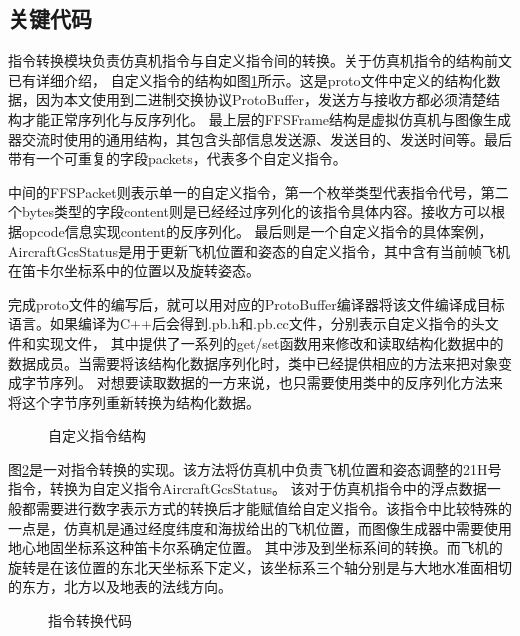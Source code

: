 \subsection{关键代码}
指令转换模块负责仿真机指令与自定义指令间的转换。关于仿真机指令的结构前文已有详细介绍，
自定义指令的结构如图\ref{protostruct}所示。这是proto文件中定义的结构化数据，因为本文使用到二进制交换协议ProtoBuffer，发送方与接收方都必须清楚结构才能正常序列化与反序列化。
最上层的FFSFrame结构是虚拟仿真机与图像生成器交流时使用的通用结构，其包含头部信息发送源、发送目的、发送时间等。最后带有一个可重复的字段packets，代表多个自定义指令。
\par
中间的FFSPacket则表示单一的自定义指令，第一个枚举类型代表指令代号，第二个bytes类型的字段content则是已经经过序列化的该指令具体内容。接收方可以根据opcode信息实现content的反序列化。
最后则是一个自定义指令的具体案例，AircraftGcsStatus是用于更新飞机位置和姿态的自定义指令，其中含有当前帧飞机在笛卡尔坐标系中的位置以及旋转姿态。
\par
完成proto文件的编写后，就可以用对应的ProtoBuffer编译器将该文件编译成目标语言。如果编译为C++后会得到.pb.h和.pb.cc文件，分别表示自定义指令的头文件和实现文件，
其中提供了一系列的get/set函数用来修改和读取结构化数据中的数据成员。当需要将该结构化数据序列化时，类中已经提供相应的方法来把对象变成字节序列。
对想要读取数据的一方来说，也只需要使用类中的反序列化方法来将这个字节序列重新转换为结构化数据。
\begin{figure}[h!]
    \begin{center}
        
        \caption{自定义指令结构}
        \label{protostruct}
    \end{center}
\end{figure}
\par
图\ref{21convert}是一对指令转换的实现。该方法将仿真机中负责飞机位置和姿态调整的21H号指令，转换为自定义指令AircraftGcsStatus。
该对于仿真机指令中的浮点数据一般都需要进行数字表示方式的转换后才能赋值给自定义指令。该指令中比较特殊的一点是，仿真机是通过经度纬度和海拔给出的飞机位置，而图像生成器中需要使用地心地固坐标系这种笛卡尔系确定位置。
其中涉及到坐标系间的转换。而飞机的旋转是在该位置的东北天坐标系下定义，该坐标系三个轴分别是与大地水准面相切的东方，北方以及地表的法线方向。
\begin{figure}[h!]
    \begin{center}
        
        \caption{指令转换代码}
        \label{21convert}
    \end{center}
\end{figure}
